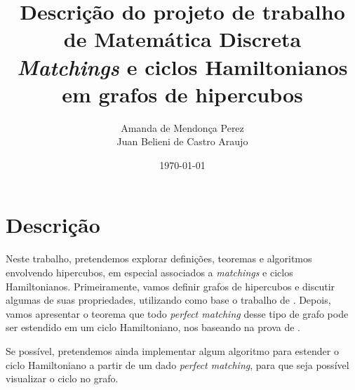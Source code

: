 \documentclass[11pt]{article}
\title{
	Descrição do projeto de trabalho de Matemática Discreta \\ \vspace{0.2cm}
	\large \textit{Matchings} e ciclos Hamiltonianos em grafos de hipercubos
}
\author{
	Amanda de Mendonça Perez \\
	Juan Belieni de Castro Araujo
}
\date{\today}
\begin{document}
	
\maketitle

\section{Descrição}

Neste trabalho, pretendemos explorar definições, teoremas e algoritmos envolvendo hipercubos, em especial associados a \textit{matchings} e ciclos Hamiltonianos. Primeiramente, vamos definir grafos de hipercubos e discutir algumas de suas propriedades, utilizando como base o trabalho de \citet{harary_survey_1988}. Depois, vamos apresentar o teorema que todo \textit{perfect matching} desse tipo de grafo pode ser estendido em um ciclo Hamiltoniano, nos baseando na prova de \citet{fink_perfect_2007}.

Se possível, pretendemos ainda implementar algum algoritmo para estender o ciclo Hamiltoniano a partir de um dado \textit{perfect matching}, para que seja possível visualizar o ciclo no grafo.



\end{document}
